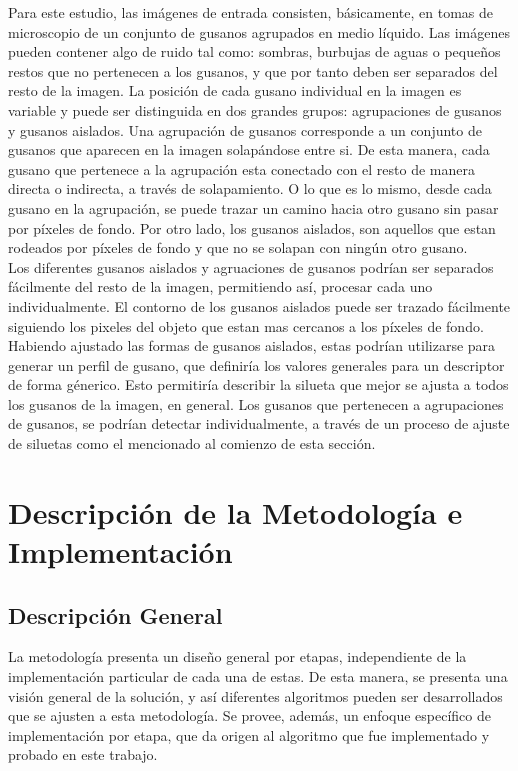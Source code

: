 Para este estudio, las im\'agenes de entrada consisten, b\'asicamente, en
tomas de microscopio de un conjunto de gusanos agrupados en medio 
l\'iquido. Las im\'agenes pueden contener algo de ruido tal como: 
sombras, burbujas de aguas o peque\~nos restos que no pertenecen a
los gusanos, y que por tanto deben ser separados del resto de la imagen. La
posici\'on de cada gusano individual en la imagen es variable y puede
ser distinguida en dos grandes grupos: agrupaciones de gusanos y gusanos aislados.
Una agrupaci\'on de gusanos corresponde a un conjunto de gusanos que aparecen en la
imagen solap\'andose entre si. De esta manera, cada gusano que pertenece
a la agrupaci\'on esta conectado con el resto de manera directa o indirecta,
 a trav\'es de solapamiento. O lo que es lo mismo, desde cada gusano en la agrupaci\'on,
se puede trazar un camino hacia otro gusano sin pasar por p\'ixeles de fondo.  
Por otro lado, los gusanos aislados, son aquellos que estan rodeados por
p\'ixeles de fondo y que no se solapan con ning\'un otro gusano.\\

Los diferentes gusanos aislados y agruaciones de gusanos podr\'ian ser
separados f\'acilmente del resto de la imagen, permitiendo as\'i, 
procesar cada uno individualmente. El contorno de los gusanos aislados
puede ser trazado f\'acilmente siguiendo los pixeles del objeto que
estan mas cercanos a los p\'ixeles de fondo. Habiendo ajustado las formas
de gusanos aislados, estas podr\'ian utilizarse para generar un perfil
de gusano, que definir\'ia los valores generales para un descriptor de forma
g\'enerico. Esto permitir\'ia describir la silueta que mejor se ajusta a todos
los gusanos de la imagen, en general.
Los gusanos que pertenecen a agrupaciones de gusanos, se podr\'ian detectar
individualmente, a trav\'es de un proceso de ajuste de siluetas como
el mencionado al comienzo de esta secci\'on.

\section{Descripci\'on de la Metodolog\'ia e Implementaci\'on}
\label{met:description}

\subsection{Descripci\'on General}

La metodolog\'ia presenta un dise\~no general por etapas, 
independiente de la implementaci\'on particular de cada una de estas. De esta
manera, se presenta una visi\'on general de la soluci\'on, y as\'i diferentes
algoritmos pueden ser desarrollados que se ajusten a esta metodolog\'ia.
Se provee, adem\'as, un enfoque espec\'ifico de implementaci\'on por etapa, que da
origen al algoritmo que fue implementado y probado en este trabajo.\\

